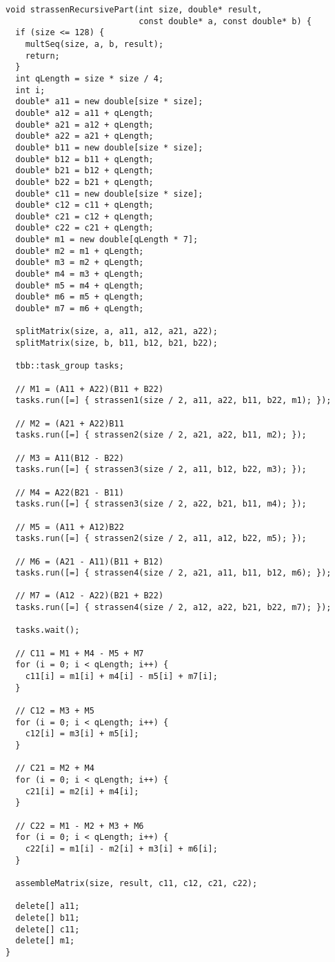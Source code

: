\documentclass{report}
\begin{document}
\begin{lstlisting}
void strassenRecursivePart(int size, double* result,
                           const double* a, const double* b) {
  if (size <= 128) {
    multSeq(size, a, b, result);
    return;
  }
  int qLength = size * size / 4;
  int i;
  double* a11 = new double[size * size];
  double* a12 = a11 + qLength;
  double* a21 = a12 + qLength;
  double* a22 = a21 + qLength;
  double* b11 = new double[size * size];
  double* b12 = b11 + qLength;
  double* b21 = b12 + qLength;
  double* b22 = b21 + qLength;
  double* c11 = new double[size * size];
  double* c12 = c11 + qLength;
  double* c21 = c12 + qLength;
  double* c22 = c21 + qLength;
  double* m1 = new double[qLength * 7];
  double* m2 = m1 + qLength;
  double* m3 = m2 + qLength;
  double* m4 = m3 + qLength;
  double* m5 = m4 + qLength;
  double* m6 = m5 + qLength;
  double* m7 = m6 + qLength;

  splitMatrix(size, a, a11, a12, a21, a22);
  splitMatrix(size, b, b11, b12, b21, b22);

  tbb::task_group tasks;

  // M1 = (A11 + A22)(B11 + B22)
  tasks.run([=] { strassen1(size / 2, a11, a22, b11, b22, m1); });

  // M2 = (A21 + A22)B11
  tasks.run([=] { strassen2(size / 2, a21, a22, b11, m2); });

  // M3 = A11(B12 - B22)
  tasks.run([=] { strassen3(size / 2, a11, b12, b22, m3); });

  // M4 = A22(B21 - B11)
  tasks.run([=] { strassen3(size / 2, a22, b21, b11, m4); });

  // M5 = (A11 + A12)B22
  tasks.run([=] { strassen2(size / 2, a11, a12, b22, m5); });

  // M6 = (A21 - A11)(B11 + B12)
  tasks.run([=] { strassen4(size / 2, a21, a11, b11, b12, m6); });

  // M7 = (A12 - A22)(B21 + B22)
  tasks.run([=] { strassen4(size / 2, a12, a22, b21, b22, m7); });

  tasks.wait();

  // C11 = M1 + M4 - M5 + M7
  for (i = 0; i < qLength; i++) {
    c11[i] = m1[i] + m4[i] - m5[i] + m7[i];
  }

  // C12 = M3 + M5
  for (i = 0; i < qLength; i++) {
    c12[i] = m3[i] + m5[i];
  }

  // C21 = M2 + M4
  for (i = 0; i < qLength; i++) {
    c21[i] = m2[i] + m4[i];
  }

  // C22 = M1 - M2 + M3 + M6
  for (i = 0; i < qLength; i++) {
    c22[i] = m1[i] - m2[i] + m3[i] + m6[i];
  }

  assembleMatrix(size, result, c11, c12, c21, c22);

  delete[] a11;
  delete[] b11;
  delete[] c11;
  delete[] m1;
}
\end{lstlisting}
\end{document}
